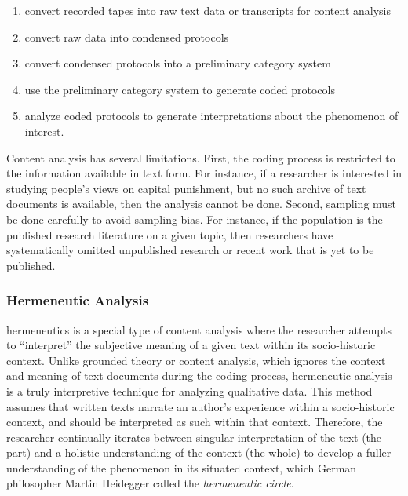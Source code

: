\begin{enumerate}
	\item convert recorded tapes into raw text data or transcripts for content analysis
	\item convert raw data into condensed protocols
	\item convert condensed protocols into a preliminary category system
	\item use the preliminary category system to generate coded protocols
	\item analyze coded protocols to generate interpretations about the phenomenon of interest.
\end{enumerate}

Content analysis has several limitations. First, the coding process is restricted to the information available in text form. For instance, if a researcher is interested in studying people's views on capital punishment, but no such archive of text documents is available, then the analysis cannot be done. Second, sampling must be done carefully to avoid sampling bias. For instance, if the population is the published research literature on a given topic, then researchers have systematically omitted unpublished research or recent work that is yet to be published.

\subsubsection{Hermeneutic Analysis}

\Gls{hermeneutics} is a special type of content analysis where the researcher attempts to ``interpret'' the subjective meaning of a given text within its socio-historic context. Unlike grounded theory or content analysis, which ignores the context and meaning of text documents during the coding process, hermeneutic analysis is a truly interpretive technique for analyzing qualitative data. This method assumes that written texts narrate an author's experience within a socio-historic context, and should be interpreted as such within that context. Therefore, the researcher continually iterates between singular interpretation of the text (the part) and a holistic understanding of the context (the whole) to develop a fuller understanding of the phenomenon in its situated context, which German philosopher Martin Heidegger called the \textit{hermeneutic circle}.

